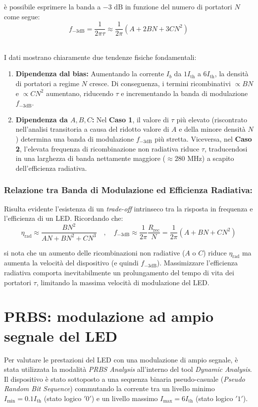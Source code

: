 \noindent è possibile esprimere la banda a $-3\text{ dB}$ in funzione del numero di portatori $N$ come segue:
\begin{equation}
f_{-3\text{dB}} = \frac{1}{2\pi \tau} \approx \frac{1}{2\pi} \left( A + 2BN + 3CN^2 \right)
\end{equation}

\noindent\\ I dati mostrano chiaramente due tendenze fisiche fondamentali:
\begin{enumerate}
    \item \textbf{Dipendenza dal bias:} Aumentando la corrente $I_b$ da $1 I_{\text{th}}$ a $6 I_{\text{th}}$, la densità di portatori a regime $N$ cresce. Di conseguenza,
    i termini ricombinativi $\propto BN$ e $\propto CN^2$ aumentano, riducendo $\tau$ e incrementando la banda di modulazione $f_{-3\text{dB}}$.
    \item \textbf{Dipendenza da $A, B, C$:} Nel \textbf{Caso 1}, il valore di $\tau$ più elevato (riscontrato nell'analisi transitoria a causa del ridotto valore di $A$ e
    della minore densità $N$) determina una banda di modulazione $f_{-3\text{dB}}$ più stretta. Viceversa, nel \textbf{Caso 2}, l'elevata frequenza di ricombinazione non
    radiativa riduce $\tau$, traducendosi in una larghezza di banda nettamente maggiore ($\approx 280$ MHz) a scapito dell'efficienza radiativa.
\end{enumerate}

\subsubsection{Relazione tra Banda di Modulazione ed Efficienza Radiativa:}
Risulta evidente l'esistenza di un \textit{trade-off} intrinseco tra la risposta in frequenza e l'efficienza di un LED. Ricordando che:
\[
\eta_{\text{rad}} \approx \frac{BN^2}{AN + BN^2 + CN^3} \quad,\quad f_{-3\text{dB}} \approx \frac{1}{2\pi}\frac{R_{\text{rec}}}{N} = \frac{1}{2\pi} \left( A + BN + CN^2 \right)
\]

\noindent si nota che un aumento delle ricombinazioni non radiative ($A$ o $C$) riduce $\eta_{\text{rad}}$ ma
aumenta la velocità del dispositivo (e quindi $f_{-3\text{dB}}$). Massimizzare l'efficienza radiativa comporta inevitabilmente un prolungamento del tempo di vita dei portatori
$\tau$, limitando la massima velocità di modulazione del LED.


\newpage
\section{PRBS: modulazione ad ampio segnale del LED}
\noindent Per valutare le prestazioni del LED con una modulazione di ampio segnale, è stata utilizzata la modalità \textit{PRBS Analysis} all'interno del tool
\textit{Dynamic Analysis}.\\ Il dispositivo è stato sottoposto a una sequenza binaria pseudo-casuale (\textit{Pseudo Random Bit Sequence}) commutando la corrente tra un
livello minimo $I_{\text{min}} = 0.1 I_{\text{th}}$ (stato logico $'0'$) e un livello massimo $I_{\text{max}} = 6 I_{\text{th}}$ (stato logico $'1'$).

